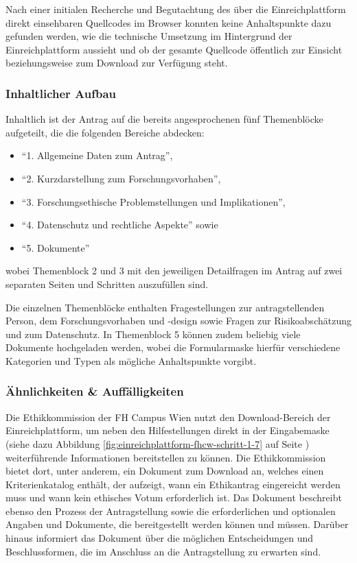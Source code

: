 \documentclass[a4paper,12pt,twoside]{scrreprt}
\begin{document}
\medskip

Nach einer initialen Recherche und Begutachtung des über die Einreichplattform direkt einsehbaren Quellcodes im Browser konnten keine Anhaltspunkte dazu gefunden werden, wie die technische Umsetzung im Hintergrund der Einreichplattform aussieht und ob der gesamte Quellcode öffentlich zur Einsicht beziehungsweise zum Download zur Verfügung steht.

\subsubsection*{Inhaltlicher Aufbau}
\label{sub-sub-sec:fhcw-inhaltlicher-aufbau}

Inhaltlich ist der Antrag auf die bereits angesprochenen fünf Themenblöcke aufgeteilt, die die folgenden Bereiche abdecken:
\begin{itemize}
    \item \enquote{1. Allgemeine Daten zum Antrag},
    \item \enquote{2. Kurzdarstellung zum Forschungsvorhaben},
    \item \enquote{3. Forschungsethische Problemstellungen und Implikationen},
    \item \enquote{4. Datenschutz und rechtliche Aspekte} sowie
    \item \enquote{5. Dokumente}
\end{itemize}

\noindent wobei Themenblock 2 und 3 mit den jeweiligen Detailfragen im Antrag auf zwei separaten Seiten und Schritten auszufüllen sind.

Die einzelnen Themenblöcke enthalten Fragestellungen zur antragstellenden Person, dem Forschungsvorhaben und -design sowie Fragen zur Risikoabschätzung und zum Datenschutz. In Themenblock 5 können zudem beliebig viele Dokumente hochgeladen werden, wobei die Formularmaske hierfür verschiedene Kategorien und Typen als mögliche Anhaltspunkte vorgibt.

\subsubsection*{Ähnlichkeiten \& Auffälligkeiten}
\label{sub-sub-sec:ähnlichkeiten-auffälligkeiten-fhcw}

Die Ethikkommission der FH Campus Wien nutzt den Download-Bereich der Einreichplattform, um neben den Hilfestellungen direkt in der Eingabemaske (siehe dazu Abbildung \ref{fig:einreichplattform-fhcw-schritt-1-7} auf Seite \pageref{fig:einreichplattform-fhcw-schritt-1-7}) weiterführende Informationen bereitstellen zu können. Die Ethikkommission bietet dort, unter anderem, ein Dokument zum Download an, welches einen Kriterienkatalog enthält, der aufzeigt, wann ein Ethikantrag eingereicht werden muss und wann kein ethisches Votum erforderlich ist. Das Dokument beschreibt ebenso den Prozess der Antragstellung sowie die erforderlichen und optionalen Angaben und Dokumente, die bereitgestellt werden können und müssen. Darüber hinaus informiert das Dokument über die möglichen Entscheidungen und Beschlussformen, die im Anschluss an die Antragstellung zu erwarten sind. \cite[1\psqq]{ethikkommission_fh_campus_wien_wissenswertes_2022}
\end{document}
